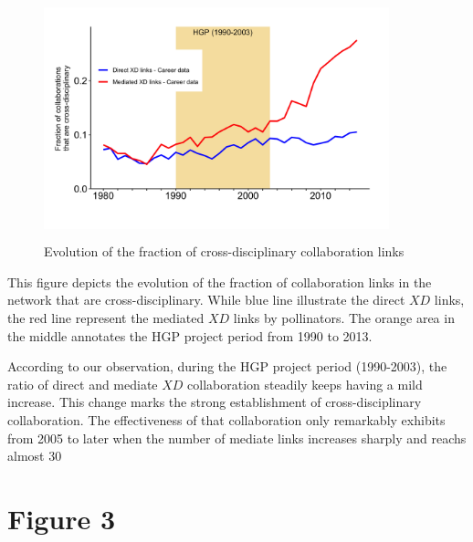 \documentclass[10pt]{article}         %
\begin{document}
\newpage
\begin{figure}[!htb]
  \centering
  \includegraphics[width=10cm, height=7cm]{Fig2B.png}
  \caption{Evolution of the fraction of cross-disciplinary collaboration links}
  \label{fig:2B}
\end{figure}

This figure depicts the evolution of the fraction of collaboration links in the network that are cross-disciplinary. While blue line illustrate the direct $XD$ links, the red line represent the mediated $XD$ links by pollinators. The orange area in the middle annotates the HGP project period from 1990 to 2013.

According to our observation, during the HGP project period (1990-2003), the ratio of direct and mediate $XD$ collaboration steadily keeps having a mild increase. This change marks the strong establishment of cross-disciplinary collaboration. The effectiveness of that collaboration only remarkably exhibits from 2005 to later when the number of mediate links increases sharply and reachs almost 30%

\newpage
\section{Figure 3}
\end{document}
